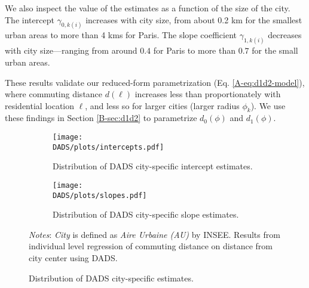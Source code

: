 \documentclass[11pt]{report}
\newcommand{\DADS}{../../output/CASD/2021-07-13/DADS}
\begin{document}
We also inspect the value of the estimates as a function of the size of the city. The intercept  $\gamma_{0,k(i)}$ increases with city size, from about 0.2 km for the smallest urban areas to more than 4 kms for Paris. The slope coefficient $\gamma_{1,k(i)}$ decreases with city size---ranging from around $0.4$ for Paris to more than $0.7$ for the small urban areas.

These results validate our reduced-form parametrization (Eq. \ref{A-eq:d1d2-model}), where commuting distance $d(\ell)$ increases less than proportionately with residential location $\ell$, and less so for larger cities (larger radius $\phi_k$). We use these findings in Section \ref{B-sec:d1d2} to parametrize $d_0(\phi)$ and $d_1(\phi)$.


%    

\begin{figure}	
	\hspace{-15mm}
	\begin{subfigure}{0.55\textwidth}
		\texttt{[image: \\DADS/plots/intercepts.pdf]}
		\vspace{-0.65cm}
		\caption{Distribution of DADS city-specific intercept estimates.\label{A-fig:DADS-intercepts}}
	\end{subfigure}%
	\hspace{5mm}
	\begin{subfigure}{0.55\textwidth}
		\texttt{[image: \\DADS/plots/slopes.pdf]}
		\vspace{-0.65cm}
		\caption{Distribution of DADS city-specific slope estimates.\label{A-fig:DADS-slopes}}
	\end{subfigure}%
	\vspace{-0.1cm}
	\caption{Distribution of DADS city-specific estimates.}
	{\footnotesize \textit{Notes}: \emph{City} is defined as \emph{Aire Urbaine (AU)} by INSEE. Results from individual level regression of commuting distance on distance from city center using DADS.}  
\end{figure}
\end{document}
